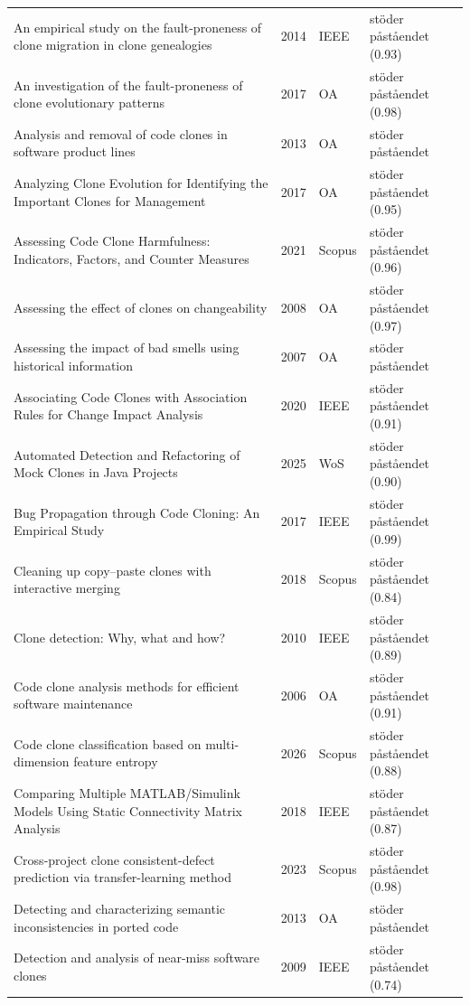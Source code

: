 \begin{longtable}{@{}%
  >{\raggedright\arraybackslash}p{}c%
  >{\raggedright\arraybackslash}p{}%
  >{\raggedright\arraybackslash}p{}@{}}
An empirical study on the fault-proneness of clone migration in clone genealogies & 2014 & IEEE & stöder påståendet (0.93) \\
An investigation of the fault-proneness of clone evolutionary patterns & 2017 & OA & stöder påståendet (0.98) \\
Analysis and removal of code clones in software product lines & 2013 & OA & stöder påståendet \\
Analyzing Clone Evolution for Identifying the Important Clones for Management & 2017 & OA & stöder påståendet (0.95) \\
Assessing Code Clone Harmfulness: Indicators, Factors, and Counter Measures & 2021 & Scopus & stöder påståendet (0.96) \\
Assessing the effect of clones on changeability & 2008 & OA & stöder påståendet (0.97) \\
Assessing the impact of bad smells using historical information & 2007 & OA & stöder påståendet \\
Associating Code Clones with Association Rules for Change Impact Analysis & 2020 & IEEE & stöder påståendet (0.91) \\
Automated Detection and Refactoring of Mock Clones in Java Projects & 2025 & WoS & stöder påståendet (0.90) \\
Bug Propagation through Code Cloning: An Empirical Study & 2017 & IEEE & stöder påståendet (0.99) \\
Cleaning up copy--paste clones with interactive merging & 2018 & Scopus & stöder påståendet (0.84) \\
Clone detection: Why, what and how? & 2010 & IEEE & stöder påståendet (0.89) \\
Code clone analysis methods for efficient software maintenance & 2006 & OA & stöder påståendet (0.91) \\
Code clone classification based on multi-dimension feature entropy & 2026 & Scopus & stöder påståendet (0.88) \\
Comparing Multiple MATLAB/Simulink Models Using Static Connectivity Matrix Analysis & 2018 & IEEE & stöder påståendet (0.87) \\
Cross-project clone consistent-defect prediction via transfer-learning method & 2023 & Scopus & stöder påståendet (0.98) \\
Detecting and characterizing semantic inconsistencies in ported code & 2013 & OA & stöder påståendet \\
Detection and analysis of near-miss software clones & 2009 & IEEE & stöder påståendet (0.74) \\

\end{longtable}
